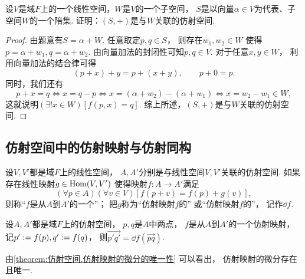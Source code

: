 \begin{example}\label{example:仿射空间.仿射空间与仿射几何的联系1}
设\(V\)是域\(F\)上的一个线性空间，\(W\)是\(V\)的一个子空间，
\(S\)是以向量\(\alpha \in V\)为代表、子空间\(W\)的一个陪集.
证明：\((S,+)\)是与\(W\)关联的仿射空间.
\begin{proof}
由题意有\(S = \alpha + W\).
任意取定\(p,q \in S\)，
则存在\(w_1,w_2 \in W\)
使得\(p = \alpha + w_1, q = \alpha + w_2\).
由向量加法的封闭性可知\(p,q \in V\).
对于任意\(x,y \in W\)，
利用向量加法的结合律可得\begin{equation*}
	(p + x) + y
	= p + (x + y),
	\qquad
	p + 0
	= p.
\end{equation*}
同时，我们还有\begin{equation*}
	p + x = q
	\iff
	x = q - p
	\iff
	x = (\alpha + w_2) - (\alpha + w_1)
	\iff
	x = w_2 - w_1 \in W,
\end{equation*}
这就说明\(
	(\exists! x \in W)
	[
		f(p,x) = q
	]
\).
综上所述，\((S,+)\)是与\(W\)关联的仿射空间.
\end{proof}
\end{example}

\subsection{仿射空间中的仿射映射与仿射同构}
\begin{definition}%
设\(V,V'\)都是域\(F\)上的线性空间，
\(A,A'\)分别是与线性空间\(V,V'\)关联的仿射空间.
如果存在线性映射\(g \in \operatorname{Hom}(V,V')\)
使得映射\(f\colon A \to A'\)满足\begin{equation*}
	(\forall p \in A)
	(\forall v \in V)
	[
		f(p + v)
		= f(p) + g(v)
	],
\end{equation*}
则称“\(f\)是从\(A\)到\(A'\)的一个”；
把\(g\)称为“仿射映射\(f\)的”
或“仿射映射\(f\)的”，
记作\(\dd{f}\).
\end{definition}

\begin{proposition}\label{theorem:仿射空间.仿射映射的微分的唯一性}
设\(A,A'\)都是域\(F\)上的仿射空间，
\(p,q\)是\(A\)中两点，
\(f\)是从\(A\)到\(A'\)的一个仿射映射，
记\(p' := f(p), q' := f(q)\)，
则\(
	\vec{p'q'}
	= \dd{f}(\vec{pq})
\).
\end{proposition}
\begin{remark}
由\cref{theorem:仿射空间.仿射映射的微分的唯一性} 可以看出，
仿射映射的微分存在且唯一.
\end{remark}

